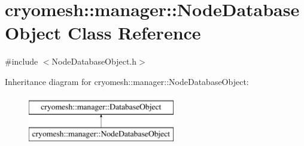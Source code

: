 \hypertarget{classcryomesh_1_1manager_1_1NodeDatabaseObject}{\section{cryomesh\-:\-:manager\-:\-:\-Node\-Database\-Object \-Class \-Reference}
\label{classcryomesh_1_1manager_1_1NodeDatabaseObject}
}


{\ttfamily \#include $<$\-Node\-Database\-Object.\-h$>$}

\-Inheritance diagram for cryomesh\-:\-:manager\-:\-:\-Node\-Database\-Object\-:\begin{figure}[H]
\begin{center}
\leavevmode
\includegraphics[height=2.000000cm]{classcryomesh_1_1manager_1_1NodeDatabaseObject}
\end{center}
\end{figure}

